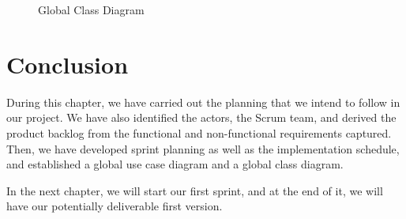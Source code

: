 \begin{figure}[htbp]
    \centering
    \caption{Global Class Diagram}
    \label{fig:global-class}
\end{figure}
\newpage

\section*{Conclusion}

During this chapter, we have carried out the planning that we intend to follow in our project. We have also identified the actors, the Scrum team, and derived the product backlog from the functional and non-functional requirements captured. Then, we have developed sprint planning as well as the implementation schedule, and established a global use case diagram and a global class diagram.

In the next chapter, we will start our first sprint, and at the end of it, we will have our potentially deliverable first version.